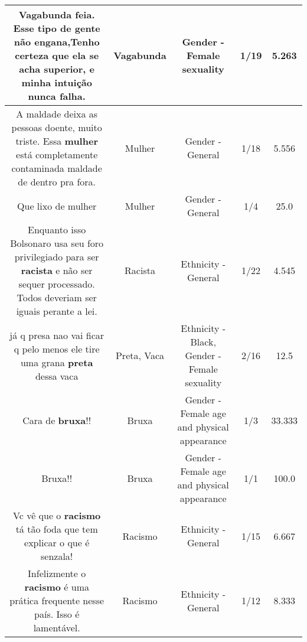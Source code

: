 \documentclass[11pt]{article}
\newlength\mylength
\begin{document}
\begin{center}
\begin{longtable}{|C{.65\mylength}|C{.30\mylength}|C{.12\mylength}|C{.12\mylength}|C{.12\mylength}|}
  \small Vagabunda feia. Esse tipo de gente não engana,Tenho certeza que ela se acha superior, e minha intuição nunca falha.\normalsize   & Vagabunda & Gender - Female sexuality & 1/19 & 5.263 \\  \hline
  \small A maldade deixa as pessoas doente, muito triste. Essa \textbf{mulher} está completamente contaminada maldade de dentro pra fora.\normalsize   & Mulher & Gender - General & 1/18 & 5.556 \\  \hline
  \small Que lixo de mulher\normalsize   & Mulher & Gender - General & 1/4 & 25.0 \\  \hline
  \small Enquanto isso Bolsonaro usa seu foro privilegiado para ser \textbf{racista} e não ser sequer processado. Todos deveriam ser iguais perante a lei.\normalsize   & Racista & Ethnicity - General & 1/22 & 4.545 \\  \hline
  \small já q presa nao vai ficar q pelo menos ele tire uma grana \textbf{preta} dessa vaca\normalsize   & Preta, Vaca & Ethnicity - Black, Gender - Female sexuality & 2/16 & 12.5 \\  \hline
  \small Cara de \textbf{bruxa}!!\normalsize   & Bruxa & Gender - Female age and physical appearance & 1/3 & 33.333 \\  \hline
  \small Bruxa!!\normalsize   & Bruxa & Gender - Female age and physical appearance & 1/1 & 100.0 \\  \hline
  \small Vc vê que o \textbf{racismo} tá tão foda que tem explicar o que é senzala!\normalsize   & Racismo & Ethnicity - General & 1/15 & 6.667 \\  \hline
  \small Infelizmente o \textbf{racismo} é uma prática frequente nesse país. Isso é lamentável.\normalsize   & Racismo & Ethnicity - General & 1/12 & 8.333 \\  \hline

\end{longtable}
\end{center}
\end{document}
